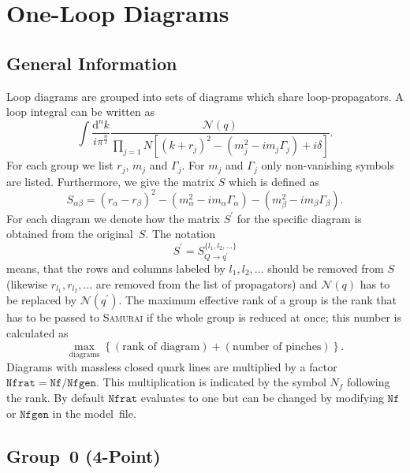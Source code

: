 \documentclass[a4paper]{article}
\begin{document}
\section{One-Loop Diagrams}
\subsection*{General Information}


Loop diagrams are grouped into sets of diagrams which share
loop-propagators. A loop integral can be written as
\begin{equation}
\int\!\frac{\mathrm{d}^nk}{i\pi^{\frac{n}{2}}}%
\frac{\mathcal{N}(q)}{\prod_{j=1}{N}\left[(k+r_j)^2-(m_j^2
   -i m_j\Gamma_j) + i\delta\right]}.
\end{equation}
For each group we list $r_j$, $m_j$ and $\Gamma_j$.
For $m_j$ and $\Gamma_j$ only non-vanishing symbols are listed.
Furthermore, we give the matrix $S$ which is defined as
\begin{equation}
S_{\alpha\beta} = (r_\alpha-r_\beta)^2
-(m_\alpha^2-im_\alpha\Gamma_\alpha)
-(m_\beta^2-im_\beta\Gamma_\beta).
\end{equation}
For each diagram we denote how the matrix $S^\prime$ for the specific diagram
is obtained from the original~$S$. The notation
\begin{equation}
S^\prime=S_{Q\to q^\prime}^{\{l_1,l_2,\ldots\}}
\end{equation}
means, that the rows and columns labeled by $l_1,l_2,\ldots$ should be
removed from $S$ (likewise $r_{l_1}, r_{l_2}, \ldots$ are removed from the
list of propagators) and $\mathcal{N}(q)$ has to be replaced by
$\mathcal{N}(q^\prime)$.
The maximum effective rank of a group is the rank that has to be passed
to \textsc{Samurai} if the whole group is reduced at once; this number
is calculated as
\begin{equation}
\max_{\text{diagrams}}\left\{(\text{rank of diagram})+
(\text{number of pinches})\right\}.
\end{equation}
Diagrams with massless closed quark lines are multiplied by a factor
$\mathtt{Nfrat}=\mathtt{Nf}/\mathtt{Nfgen}$. This multiplication is indicated
by the symbol $N_f$ following the rank. By default $\mathtt{Nfrat}$ evaluates
to one but can be changed by modifying $\mathtt{Nf}$ or $\mathtt{Nfgen}$ in the
model~file.


\subsection{Group~0 (4-Point)}
\end{document}
